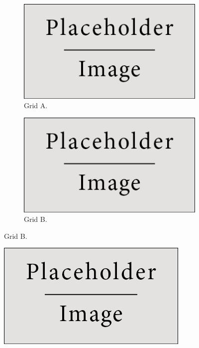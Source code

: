 \documentclass[final]{beamer}
\newlength{\threecolwid}
\begin{document}
\begin{frame}[t]
\begin{columns}[t]
\begin{column}{\threecolwid}
      \begin{minipage}[b][0.3\textheight][c]{0.4\textwidth}
        \begin{figure}[ht]
          \begin{subfigure}[t]{\textwidth}
            \centering
            \includegraphics[width=\linewidth]{figure/placeholder.jpg}
            \caption{Grid A.}
          \end{subfigure}
          \begin{subfigure}[t]{\textwidth}
            \centering
            \includegraphics[width=\linewidth]{figure/placeholder.jpg}
            \caption{Grid B.}
          \end{subfigure}
        \end{figure}
          \end{minipage}
        \begin{minipage}[b][0.3\textheight][c]{0.4\textwidth}
          \begin{figure}
            \includegraphics[width=\linewidth]{figure/placeholder.jpg}

\end{figure}
\end{minipage}
\end{column}
\end{columns}
\end{frame}
\end{document}
